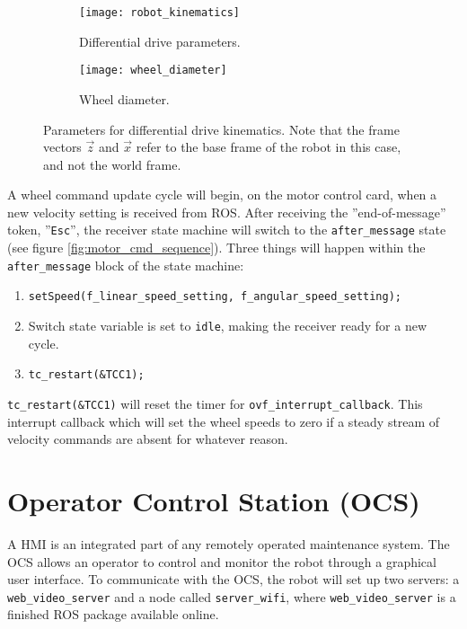  \begin{figure}[H]
 	\centering
 	\begin{subfigure}[b]{0.58\textwidth}
 		\texttt{[image: robot\_kinematics]}
 		\caption{Differential drive parameters.}
 		\label{fig:robot_kinematics}
 	\end{subfigure}
 	\begin{subfigure}[b]{0.38\textwidth}
 		
 		\texttt{[image: wheel\_diameter]}
 		\caption{Wheel diameter.}
 		\label{fig:wheel_diameter}
 	\end{subfigure}
 	\caption{\label{fig:robot_kinematics}Parameters for differential drive kinematics. Note that the frame vectors $\vec{z}$ and $\vec{x}$ refer to the base frame of the robot in this case, and not the world frame.}
 \end{figure}

A wheel command update cycle will begin, on the motor control card, when a new velocity setting is received from \ac{ROS}. After receiving the ''end-of-message'' token, ''\texttt{Esc}'', the receiver state machine will switch to the \texttt{after\_message} state (see figure \ref{fig:motor_cmd_sequence}). Three things will happen within the \texttt{after\_message} block of the state machine:

\begin{enumerate}
	\item \texttt{setSpeed(f\_linear\_speed\_setting, f\_angular\_speed\_setting);}
	\item Switch state variable is set to \texttt{idle}, making the receiver ready for a new cycle.
	\item \texttt{tc\_restart(\&TCC1);}
\end{enumerate}

\texttt{tc\_restart(\&TCC1)} will reset the timer for \texttt{ovf\_interrupt\_callback}. This interrupt callback which will set the wheel speeds to zero if a steady stream of velocity commands are absent for whatever reason. 

\section{Operator Control Station (OCS)}

A \ac{HMI} is an integrated part of any remotely operated maintenance system. The \ac{OCS} allows an operator to control and monitor the robot through a graphical user interface. To communicate with the \ac{OCS}, the robot will set up two servers: a \texttt{web\_video\_server} and a node called \texttt{server\_wifi}, where \texttt{web\_video\_server} is a finished \ac{ROS} package available online.

